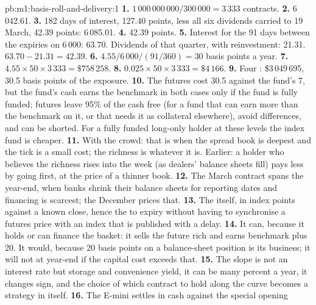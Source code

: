 \begin{solution}{pb:m1:basis-roll-and-delivery:1}
\textbf{1.} $1\,000\,000\,000/300\,000 = 3\,333$ contracts.
\textbf{2.} 6\,042.61.
\textbf{3.} 182 days of interest, 127.40 points, less all six dividends
carried to 19 March, 42.39 points: 6\,085.01.
\textbf{4.} 42.39 points.
\textbf{5.} Interest for the 91 days between the expiries on 6\,000: 63.70.
Dividends of that quarter, with reinvestment: 21.31. $63.70 - 21.31 = 42.39$.
\textbf{6.} $4.55/6\,000/(91/360) = 30$ basis points a year.
\textbf{7.} $4.55 \times 50 \times 3\,333 = \$758\,258$.
\textbf{8.} $0.025 \times 50 \times 3\,333 = \$4\,166$.
\textbf{9.} Four : \$3\,049\,695, 30.5 basis points of the exposure.
\textbf{10.} The futures cost 30.5 against the fund's 7, but the fund's cash
earns the benchmark in both cases only if the fund is fully funded; futures
leave 95\% of the cash free (for a fund that can earn more than the benchmark
on it, or that needs it as collateral elsewhere), avoid 
differences, and can be shorted. For a fully funded long-only holder at these
levels the index fund is cheaper.
\textbf{11.} With the crowd: that is when the spread book is deepest and the
tick is a small cost; the richness is whatever it is. Earlier: a holder who
believes the richness rises into the  week (as dealers' balance sheets
fill) pays less by going first, at the price of a thinner book.
\textbf{12.} The March contract spans the year-end, when banks shrink their
balance sheets for reporting dates and financing is scarcest; the December
 prices that.
\textbf{13.} The  itself, in index points against a known close, hence
the  to expiry without having to synchronise a futures
price with an index that is published with a delay.
\textbf{14.} It can, because it holds or can finance the basket: it sells
the future rich and earns benchmark plus 20. It would, because 20 basis
points on a balance-sheet position is its business; it will not at year-end
if the capital cost exceeds that.
\textbf{15.} The slope is not an interest rate but storage and convenience
yield, it can be many percent a year, it changes sign, and the choice of
which contract to hold along the curve becomes a strategy in itself.
\textbf{16.} The E-mini settles in cash against the special opening

\end{solution}

